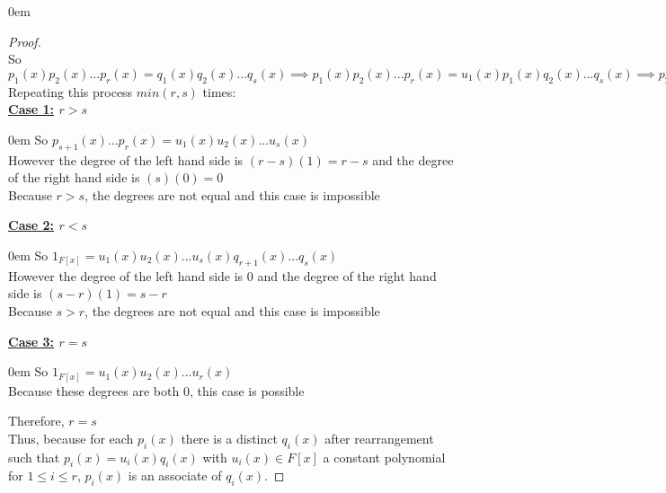 \documentclass{article} %
\begin{document}
\begin{addmargin}[1em]{0em}
\begin{proof}
\\ So $p_1(x)p_2(x)...p_r(x) = q_1(x)q_2(x)...q_s(x) \implies p_1(x)p_2(x)...p_r(x) = u_1(x)p_1(x)q_2(x)...q_s(x) \implies p_2(x)...p_r(x) = u_1(x)q_2(x)...q_s(x)$
\\Repeating this process $min(r,s)$ times:
\\ \textbf{\underline{Case 1:} $r > s$}
\begin{addmargin}[1em]{0em}
So $p_{s+1}(x)...p_r(x) = u_1(x)u_2(x)...u_s(x)$
\\However the degree of the left hand side is $(r - s)(1) = r - s$ and the degree of the right hand side is $(s)(0) = 0$
\\Because $r > s$, the degrees are not equal and this case is impossible
\end{addmargin}
\textbf{\underline{Case 2:} $r < s$}
\begin{addmargin}[1em]{0em}
So $1_{F[x]} = u_1(x)u_2(x)...u_s(x)q_{r+1}(x)...q_s(x)$
\\However the degree of the left hand side is $0$ and the degree of the right hand side is $(s - r)(1) = s-r$
\\Because $s > r$, the degrees are not equal and this case is impossible
\end{addmargin}
\textbf{\underline{Case 3:} $r = s$}
\begin{addmargin}[1em]{0em}
So $1_{F[x]} = u_1(x)u_2(x)...u_r(x)$
\\Because these degrees are both $0$, this case is possible
\end{addmargin}
Therefore, $r = s$
\\Thus, because for each $p_i(x)$ there is a distinct $q_i(x)$ after rearrangement such that $p_i(x) = u_i(x)q_i(x)$ with $u_i(x) \in F[x]$ a constant polynomial for $1 \leq i \leq r$, $p_i(x)$ is an associate of $q_i(x)$.
\end{proof}
\end{addmargin}

\end{document}
